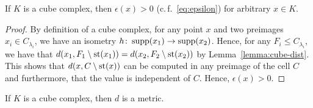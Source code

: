 \begin{lemma}
  If \(K\) is a cube complex, then \(\epsilon(x) > 0\) (c.\,f.~\eqref{eq:epsilon}) for arbitrary \(x \in K\).
\end{lemma}

\begin{proof}
  By definition of a cube complex, for any point \(x\) and two preimages \(x_i \in C_{\lambda_i}\), we have an isometry \(h \colon \operatorname{supp}(x_1) \to \operatorname{supp}(x_2)\). Hence, for any \(F_i \leq C_{\lambda_i}\), we have that \(d(x_1, F_1 \setminus \operatorname{st}(x_1)) = d(x_2, F_2 \setminus \operatorname{st}(x_2))\) by Lemma~\ref{lemma:cube-dist}. This shows that \(d(x, C \setminus \operatorname{st}(x))\) can be computed in any preimage of the cell \(C\) and furthermore, that the value is independent of \(C\). Hence, \(\epsilon(x) > 0 \).
\end{proof}

\begin{thm}
  If \(K\) is a cube complex, then \(d\) is a metric.
\end{thm}

